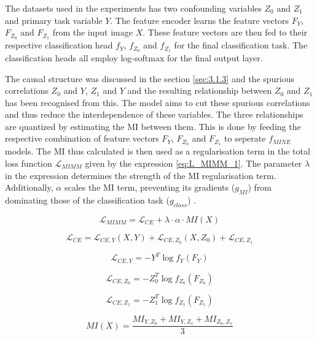 \documentclass[12pt,DIV14,BCOR12mm,a4paper,footinclude=false,headinclude,parskip=half-,twoside,openright,cleardoublepage=empty,toc=index,bibliography=totoc,listof=totoc]{scrreprt}
\numberwithin{equation}{chapter}
\begin{document}
The datasets used in the experiments has two confounding variables $Z_0$ and $Z_1$ and primary task variable $Y$. The feature encoder learns the feature vectors $F_Y$, $F_{Z_0}$ and $F_{Z_1}$ from the input image $X$. These feature vectors are then fed to their respective classification head ${f}_Y$, ${f}_{Z_0}$ and ${f}_{Z_1}$ for the final classification task. The classification heads all employ log-softmax for the final output layer.

The causal structure was discussed in the section \ref{sec:3.1.3} and the spurious correlations $Z_0$ and $Y$, $Z_1$ and $Y$ and the resulting relationship between $Z_0$ and $Z_1$ has been recognised from this. The model aims to cut these spurious correlations and thus reduce the interdependence of these variables. The three relationships are quantized by estimating the MI between them. This is done by feeding the respective combination of feature vectors $F_Y$, $F_{Z_0}$ and $F_{Z_1}$ to seperate $f_{MINE}$ models. The MI thus calculated is then used as a regularisation term in the total loss function $\mathcal{L}_{MIMM}$ given by the expression \ref{eq:L_MIMM_1}. The parameter $\lambda$ in the expression determines the strength of the MI regularisation term. Additionally, $\alpha$ scales the MI term, preventing its gradients ($g_{MI}$) from dominating those of the classification task ($g_{class}$) \cite{DBLP:journals/corr/abs-1801-04062}.

\begin{equation}\label{eq:L_MIMM_1}
 \mathcal{L}_{MIMM} = \mathcal{L}_{CE} + \lambda \cdot \alpha \cdot MI(X)
\end{equation}

\begin{equation}
    \mathcal{L}_{CE} = \mathcal{L}_{CE, Y}(X,Y) + \mathcal{L}_{CE, Z_0}(X,Z_0) + \mathcal{L}_{CE,Z_{1}}
\end{equation}

\begin{equation}
 \mathcal{L}_{CE,Y} = -Y^T \log f_Y(F_Y)
\end{equation}

\begin{equation}
 \mathcal{L}_{CE,Z_{0}} = -Z_{0}^T \log f_{Z_0}(F_{Z_0})
\end{equation}

\begin{equation}
 \mathcal{L}_{CE,Z_{1}} = -Z_{1}^T \log f_{Z_1}(F_{Z_1})
\end{equation}

\begin{equation}
 MI(X) = \frac{MI_{Y,Z_0} + MI_{Y,Z_1} + MI_{Z_0, Z_1}}{3}
\end{equation}
\end{document}
